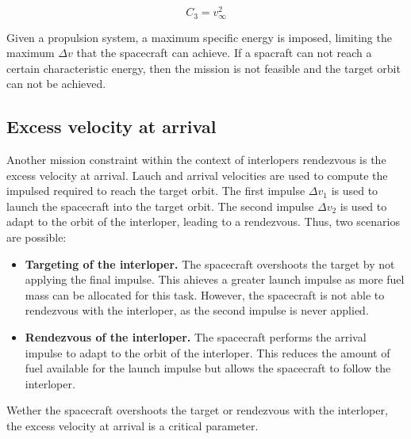 \begin{equation}
        C_3 = v_{\infty}^2
        \label{eq:c3}
\end{equation}

Given a propulsion system, a maximum specific energy is imposed, limiting the
maximum $\Delta v$ that the spacecraft can achieve. If a spacraft can not reach
a certain characteristic energy, then the mission is not feasible and the
target orbit can not be achieved.

\subsection{Excess velocity at arrival}

Another mission constraint within the context of interlopers rendezvous is the
excess velocity at arrival. Lauch and arrival velocities are used to compute the
impulsed required to reach the target orbit. The first impulse $\Delta v_1$ is
used to launch the spacecraft into the target orbit. The second impulse $\Delta
v_2$ is used to adapt to the orbit of the interloper, leading to a rendezvous.
Thus, two scenarios are possible:

\begin{itemize}

    \item \textbf{Targeting of the interloper.} The spacecraft overshoots the target by
    not applying the final impulse. This ahieves a greater launch
    impulse as more fuel mass can be allocated for this task. However, the
    spacecraft is not able to rendezvous with the interloper, as the second
    impulse is never applied.

    \item \textbf{Rendezvous of the interloper.} The spacecraft performs the
    arrival impulse to adapt to the orbit of the interloper. This reduces the
    amount of fuel available for the launch impulse but allows the spacecraft to
    follow the interloper.

\end{itemize}

Wether the spacecraft overshoots the target or rendezvous with the interloper,
the excess velocity at arrival is a critical parameter. 
